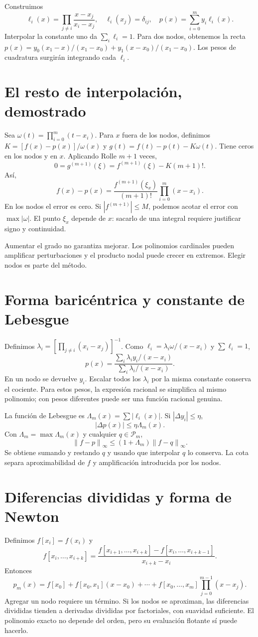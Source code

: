 \documentclass[11pt,a4paper]{article}
\newcommand{\norm}[1]{\left\lVert #1\right\rVert}
\theoremstyle{definition}
\begin{document}
Construimos
\[
\ell_i(x)=\prod_{j\ne i}\frac{x-x_j}{x_i-x_j},
\quad \ell_i(x_j)=\delta_{ij},
\quad p(x)=\sum_{i=0}^m y_i\ell_i(x).
\]
Interpolar la constante uno da $\sum_i\ell_i=1$. Para dos nodos, obtenemos la recta
$p(x)=y_0(x_1-x)/(x_1-x_0)+y_1(x-x_0)/(x_1-x_0)$.
Los pesos de cuadratura surgirán integrando cada $\ell_i$.

\section{El resto de interpolación, demostrado}
Sea $\omega(t)=\prod_{i=0}^m(t-x_i)$. Para $x$ fuera de los nodos, definimos
$K=[f(x)-p(x)]/\omega(x)$ y $g(t)=f(t)-p(t)-K\omega(t)$. Tiene ceros en los nodos y en $x$. Aplicando Rolle $m+1$ veces,
\[
0=g^{(m+1)}(\xi)=f^{(m+1)}(\xi)-K(m+1)!.
\]
Así,
\[
f(x)-p(x)=\frac{f^{(m+1)}(\xi_x)}{(m+1)!}\prod_{i=0}^m(x-x_i).
\]
En los nodos el error es cero. Si $|f^{(m+1)}|\le M$, podemos acotar el error con $\max|\omega|$. El punto $\xi_x$ depende de $x$: sacarlo de una integral requiere justificar signo y continuidad.

Aumentar el grado no garantiza mejorar. Los polinomios cardinales pueden amplificar perturbaciones y el producto nodal puede crecer en extremos. Elegir nodos es parte del método.

\section{Forma baricéntrica y constante de Lebesgue}
Definimos $\lambda_i=[\prod_{j\ne i}(x_i-x_j)]^{-1}$. Como
$\ell_i=\lambda_i\omega/(x-x_i)$ y $\sum\ell_i=1$,
\[
p(x)=\frac{\sum_i\lambda_i y_i/(x-x_i)}
{\sum_i\lambda_i/(x-x_i)}.
\]
En un nodo se devuelve $y_i$. Escalar todos los $\lambda_i$ por la misma constante conserva el cociente. Para estos pesos, la expresión racional se simplifica al mismo polinomio; con pesos diferentes puede ser una función racional genuina.

La función de Lebesgue es $\Lambda_m(x)=\sum|\ell_i(x)|$. Si $|\Delta y_i|\le\eta$,
\[
|\Delta p(x)|\le\eta\Lambda_m(x).
\]
Con $\Lambda_m=\max\Lambda_m(x)$ y cualquier $q\in\mathcal P_m$,
\[
\norm{f-p}_\infty\le(1+\Lambda_m)\norm{f-q}_\infty.
\]
Se obtiene sumando y restando $q$ y usando que interpolar $q$ lo conserva. La cota separa aproximabilidad de $f$ y amplificación introducida por los nodos.

\section{Diferencias divididas y forma de Newton}
Definimos $f[x_i]=f(x_i)$ y
\[
f[x_i,\ldots,x_{i+k}]
=\frac{f[x_{i+1},\ldots,x_{i+k}]-f[x_i,\ldots,x_{i+k-1}]}
{x_{i+k}-x_i}.
\]
Entonces
\[
p_m(x)=f[x_0]+f[x_0,x_1](x-x_0)+\cdots+
f[x_0,\ldots,x_m]\prod_{j=0}^{m-1}(x-x_j).
\]
Agregar un nodo requiere un término. Si los nodos se aproximan, las diferencias divididas tienden a derivadas divididas por factoriales, con suavidad suficiente. El polinomio exacto no depende del orden, pero su evaluación flotante sí puede hacerlo.
\end{document}
